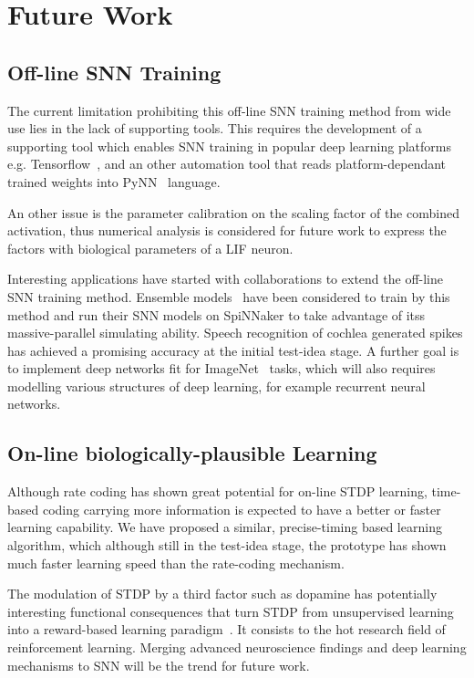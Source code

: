 \section{Future Work}
\subsection{Off-line SNN Training}
The current limitation prohibiting this off-line SNN training method from wide use lies in the lack of supporting tools.
This requires the development of a supporting tool which enables SNN training in popular deep learning platforms e.g. Tensorflow~\citep{tensorflow2015-whitepaper}, and an other automation tool that reads platform-dependant trained weights into PyNN~\citep{davison2008pynn} language.

An other issue is the parameter calibration on the scaling factor of the combined activation, thus numerical analysis is considered for future work to express the factors with biological parameters of a LIF neuron.

Interesting applications have started with collaborations to extend the off-line SNN training method.
Ensemble models~\citep{rokach2010ensemble} have been considered to train by this method and run their SNN models on SpiNNaker to take advantage of itss massive-parallel simulating ability.
Speech recognition of cochlea generated spikes has achieved a promising accuracy at the initial test-idea stage.
A further goal is to implement deep networks fit for ImageNet~\citep{deng2009imagenet} tasks, which will also requires modelling various structures of deep learning, for example recurrent neural networks.


\subsection{On-line biologically-plausible Learning}
Although rate coding has shown great potential for on-line STDP learning, time-based coding carrying more information is expected to have a better or faster learning capability.
We have proposed a similar, precise-timing based learning algorithm, which although still in the test-idea stage, the prototype has shown much faster learning speed than the rate-coding mechanism.

The modulation of STDP by a third factor such as dopamine has potentially interesting functional consequences that turn STDP from unsupervised learning into a reward-based learning paradigm~\citep{izhikevich2007solving}.
It consists to the hot research field of reinforcement learning.
Merging advanced neuroscience findings and deep learning mechanisms to SNN will be the trend for future work.


